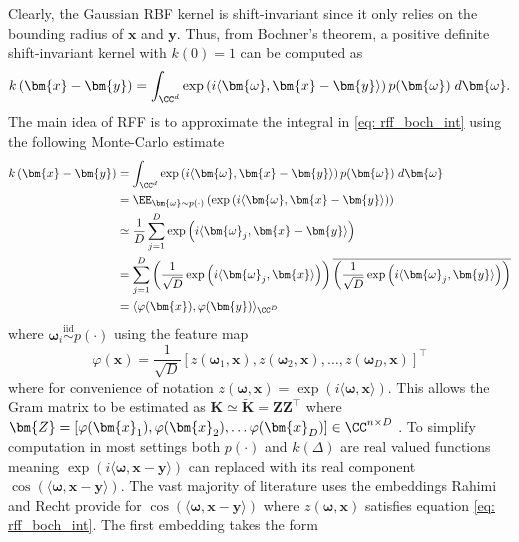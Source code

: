 Clearly, the Gaussian RBF kernel is shift-invariant since it only relies on the bounding radius of $\bm{x}$ and $\bm{y}$. Thus, from Bochner's theorem, a positive definite shift-invariant kernel with $k(0) = 1$ can be computed as
\begin{equation} \label{eq: rff_boch_int}
    k \left( \bm{x} - \bm{y} \right) = \int_{\CC^d} \exp \left( i \langle \bm{\omega} , \bm{x} - \bm{y} \rangle \right) p (\bm{\omega}) \; d \bm{\omega} .
\end{equation}
The main idea of RFF is to approximate the integral in \ref{eq: rff_boch_int} using the following Monte-Carlo estimate
\begin{align*}
    k \left( \bm{x} - \bm{y} \right)
     & = \int_{\CC^d} \exp \left( i \langle \bm{\omega} , \bm{x} - \bm{y} \rangle \right) p (\bm{\omega}) \; d \bm{\omega}                                                                                                            \\
     & = \EE_{\bm{\omega} \sim p (\cdot)} \left( \exp \left( i \langle \bm{\omega} , \bm{x} - \bm{y} \rangle \right) \right)                                                                                                          \\
     & \simeq \frac{1}{D} \sum_{j=1}^{D} \exp \left( i \langle \bm{\omega}_{j} , \bm{x} - \bm{y} \rangle \right)                                                                                                                      \\
     & = \sum_{j=1}^{D} \left( \frac{1}{\sqrt{D}} \exp \left( i \langle \bm{\omega}_{j} , \bm{x} \rangle \right) \right) \overline{\left( \frac{1}{\sqrt{D}} \exp \left( i \langle \bm{\omega}_{j} , \bm{y} \rangle \right) \right) } \\
     & = \langle \varphi (\bm{x}) , \varphi (\bm{y}) \rangle_{\CC^D}
\end{align*}
where $\bm{\omega}_i \stackrel{\text{iid}}{\sim} p(\cdot)$ using the feature map
\begin{equation}
    \varphi (\bm{x}) = \frac{1}{\sqrt{D}} \left[ z \left( \bm{\omega}_1, \bm{x} \right), z \left( \bm{\omega}_2, \bm{x} \right), \ldots , z \left( \bm{\omega}_D, \bm{x} \right) \right]^{\intercal}
\end{equation}
where for convenience of notation $z \left( \bm{\omega}, \bm{x} \right) = \exp \left( i \langle \bm{\omega} , \bm{x} \rangle \right)$. This allows the Gram matrix to be estimated as $\bm{K} \simeq \bm{\widetilde{K}} = \bm{Z} \bm{Z}^{\intercal}$ where $\bm{Z} = \left[ \varphi (\bm{x}_1), \varphi (\bm{x}_2), \ldots \varphi (\bm{x}_D) \right] \in \CC^{n \times D}$ \cite{NIPS2007_013a006f,LiuFanghui2021RFfK,JMLR:v17:14-538}. To simplify computation in most settings both $p(\cdot)$ and $k(\Delta)$ are real valued functions meaning $\exp \left( i \langle \bm{\omega} , \bm{x} - \bm{y} \rangle \right)$ can replaced with its real component $\cos \left( \langle \bm{\omega} , \bm{x} - \bm{y} \rangle \right)$. The vast majority of literature uses the embeddings Rahimi and Recht provide for $\cos \left( \langle \bm{\omega} , \bm{x} - \bm{y} \rangle \right)$ where $z \left( \bm{\omega}, \bm{x} \right)$ satisfies equation \ref{eq: rff_boch_int}. The first embedding takes the form
